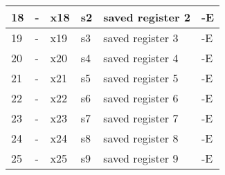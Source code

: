 \begin{table}[!ht]
{\begin{tabular}{|l|l|l|l|l|l|}
  18                                                                      & -                                                                                   & x18               & s2                & saved register 2                                                                & -E                       \\ \hline
  19                                                                      & -                                                                                   & x19               & s3                & saved register 3                                                                & -E                       \\ \hline
  20                                                                      & -                                                                                   & x20               & s4                & saved register 4                                                                & -E                       \\ \hline
  21                                                                      & -                                                                                   & x21               & s5                & saved register 5                                                                & -E                       \\ \hline
  22                                                                      & -                                                                                   & x22               & s6                & saved register 6                                                                & -E                       \\ \hline
  23                                                                      & -                                                                                   & x23               & s7                & saved register 7                                                                & -E                       \\ \hline
  24                                                                      & -                                                                                   & x24               & s8                & saved register 8                                                                & -E                       \\ \hline
  25                                                                      & -                                                                                   & x25               & s9                & saved register 9                                                                & -E                       \\ \hline

\end{tabular}}
\end{table}
